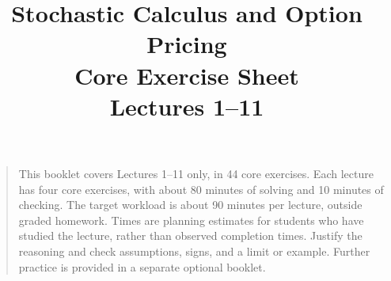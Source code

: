 \documentclass[11pt]{article}
\title{Stochastic Calculus and Option Pricing\\Core Exercise Sheet\\\large Lectures 1--11}
\author{}
\date{}
\newcommand{\1}{\mathbf{1}}
\theoremstyle{definition}
\begin{document}
\maketitle
\vspace{-1.2em}
\begin{quote}\small
This booklet covers Lectures 1--11 only, in 44 core exercises.
Each lecture has four core exercises, with about 80 minutes of solving
and 10 minutes of checking. The target workload is about 90 minutes per
lecture, outside graded homework. Times are planning estimates for students
who have studied the lecture, rather than observed completion times.
Justify the reasoning and check assumptions, signs, and a limit or example.
Further practice is provided in a separate optional booklet.
\end{quote}
\def\ExercisesSynthesis{true}
\setcounter{section}{0}

\clearpage
\setcounter{section}{1}

\clearpage
\setcounter{section}{2}

\clearpage
\setcounter{section}{3}

\clearpage
\setcounter{section}{4}

\clearpage
\setcounter{section}{5}

\clearpage
\setcounter{section}{6}

\clearpage
\setcounter{section}{7}

\clearpage
\setcounter{section}{8}

\clearpage
\setcounter{section}{9}

\clearpage
\setcounter{section}{10}

\end{document}
